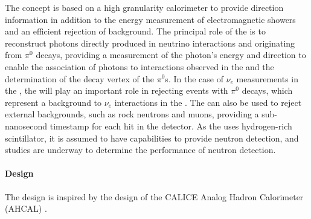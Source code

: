 The   concept is based on a high granularity calorimeter to provide direction information in addition to the energy measurement of electromagnetic showers and an efficient rejection of background. The principal role of the  is to reconstruct photons directly produced in neutrino interactions and originating from $\pi^0$ decays, providing a measurement of the photon's energy and direction to enable the association of photons to interactions observed in the  and the determination of the decay vertex of the $\pi^0$s. In the case of $\nu_e$ measurements in the , the  will play an important role in rejecting events with $\pi^0$ decays, which represent a background to $\nu_e$ interactions in the . The  can also be used to reject external backgrounds, such as rock neutrons and muons, providing a sub-nanosecond timestamp \cite{Simon:2013zya} for each hit in the detector. As the  uses hydrogen-rich scintillator, it is assumed to have capabilities to provide neutron detection, and studies are underway to determine the performance of neutron detection.

\paragraph{ Design}

The  design is inspired by the design of the CALICE Analog Hadron Calorimeter (AHCAL) \cite{collaboration:2010hb}. %

